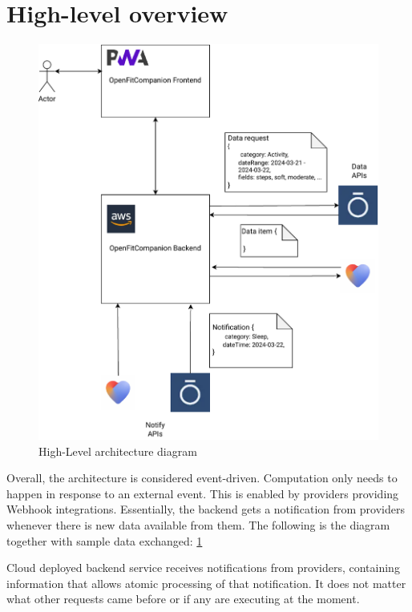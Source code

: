 \section{High-level overview}
\begin{figure}
    
    \centering
    \includegraphics[width=\textwidth,height=\textheight,keepaspectratio]{../images/highLevel.pdf}
    \caption{High-Level architecture diagram}
    \label{fig:1}
    
\end{figure}
Overall, the architecture is considered event-driven. Computation only needs to happen in response to an external event. This is enabled by providers providing Webhook integrations. Essentially, the backend gets a notification from providers whenever there is new data available from them. The following is the diagram together with sample data exchanged: \ref{fig:1}

Cloud deployed backend service receives notifications from providers, containing information that allows atomic processing of that notification. It does not matter what other requests came before or if any are executing at the moment. 

